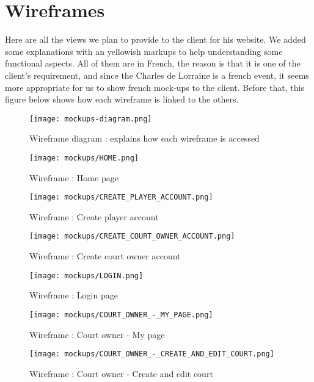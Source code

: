 \section{Wireframes}

Here are all the views we plan to provide to the client for his website. We
added some explanations with an yellowish markups to help understanding
some functional aspects. All of them are in French, the reason is that it is one of the
client's requirement, and since the Charles de Lorraine is a french event, it seems more
appropriate for us to show french mock-ups to the client. Before that, this figure below shows
how each wireframe is linked to the others.

\begin{figure}[!ht]
    \centering
    \texttt{[image: mockups-diagram.png]}
    \caption{Wireframe diagram : explains how each wireframe is accessed}
\end{figure}
\FloatBarrier

\begin{figure}[!ht]
    \centering
    \texttt{[image: mockups/HOME.png]}
    \caption{Wireframe : Home page}
\end{figure}
\FloatBarrier

\begin{figure}[!ht]
    \centering
    \texttt{[image: mockups/CREATE\_PLAYER\_ACCOUNT.png]}
    \caption{Wireframe : Create player account}
\end{figure}
\FloatBarrier

\begin{figure}[!ht]
    \centering
    \texttt{[image: mockups/CREATE\_COURT\_OWNER\_ACCOUNT.png]}
    \caption{Wireframe : Create court owner account}
\end{figure}
\FloatBarrier

\begin{figure}[!ht]
    \centering
    \texttt{[image: mockups/LOGIN.png]}
    \caption{Wireframe : Login page}
\end{figure}
\FloatBarrier

\begin{figure}[!ht]
    \centering
    \texttt{[image: mockups/COURT\_OWNER\_-\_MY\_PAGE.png]}
    \caption{Wireframe : Court owner - My page}
\end{figure}
\FloatBarrier

\begin{figure}[!ht]
    \centering
    \texttt{[image: mockups/COURT\_OWNER\_-\_CREATE\_AND\_EDIT\_COURT.png]}
    \caption{Wireframe : Court owner - Create and edit court}
\end{figure}
\FloatBarrier


